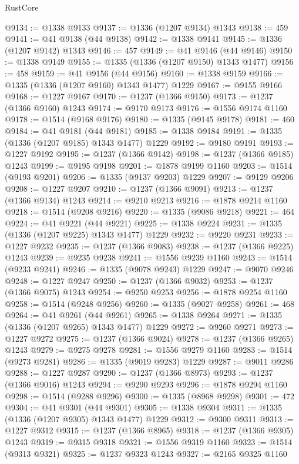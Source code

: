 \begin{lexlean}{RustCore}
\begin{coremodule}
@9134 := @1338 @9133
@9137 := @1336 (@1207 @9134) @1343
@9138 := 459
@9141 := @41 @9138 (@44 @9138)
@9142 := @1338 @9141
@9145 := @1336 (@1207 @9142) @1343
@9146 := 457
@9149 := @41 @9146 (@44 @9146)
@9150 := @1338 @9149
@9155 := @1335 (@1336 (@1207 @9150) @1343 @1477)
@9156 := 458
@9159 := @41 @9156 (@44 @9156)
@9160 := @1338 @9159
@9166 := @1335 (@1336 (@1207 @9160) @1343 @1477) @1229
@9167 := @9155 @9166
@9168 := @1227 @9167
@9170 := @1237 (@1366 @9150)
@9173 := @1237 (@1366 @9160) @1243
@9174 := @9170 @9173
@9176 := @1556 @9174 @1160
@9178 := @1514 (@9168 @9176)
@9180 := @1335 (@9145 @9178)
@9181 := 460
@9184 := @41 @9181 (@44 @9181)
@9185 := @1338 @9184
@9191 := @1335 (@1336 (@1207 @9185) @1343 @1477) @1229
@9192 := @9180 @9191
@9193 := @1227 @9192
@9195 := @1237 (@1366 @9142)
@9198 := @1237 (@1366 @9185) @1243
@9199 := @9195 @9198
@9201 := @1878 @9199 @1160
@9203 := @1514 (@9193 @9201)
@9206 := @1335 (@9137 @9203) @1229
@9207 := @9129 @9206
@9208 := @1227 @9207
@9210 := @1237 (@1366 @9091)
@9213 := @1237 (@1366 @9134) @1243
@9214 := @9210 @9213
@9216 := @1878 @9214 @1160
@9218 := @1514 (@9208 @9216)
@9220 := @1335 (@9086 @9218)
@9221 := 464
@9224 := @41 @9221 (@44 @9221)
@9225 := @1338 @9224
@9231 := @1335 (@1336 (@1207 @9225) @1343 @1477) @1229
@9232 := @9220 @9231
@9233 := @1227 @9232
@9235 := @1237 (@1366 @9083)
@9238 := @1237 (@1366 @9225) @1243
@9239 := @9235 @9238
@9241 := @1556 @9239 @1160
@9243 := @1514 (@9233 @9241)
@9246 := @1335 (@9078 @9243) @1229
@9247 := @9070 @9246
@9248 := @1227 @9247
@9250 := @1237 (@1366 @9032)
@9253 := @1237 (@1366 @9075) @1243
@9254 := @9250 @9253
@9256 := @1878 @9254 @1160
@9258 := @1514 (@9248 @9256)
@9260 := @1335 (@9027 @9258)
@9261 := 468
@9264 := @41 @9261 (@44 @9261)
@9265 := @1338 @9264
@9271 := @1335 (@1336 (@1207 @9265) @1343 @1477) @1229
@9272 := @9260 @9271
@9273 := @1227 @9272
@9275 := @1237 (@1366 @9024)
@9278 := @1237 (@1366 @9265) @1243
@9279 := @9275 @9278
@9281 := @1556 @9279 @1160
@9283 := @1514 (@9273 @9281)
@9286 := @1335 (@9019 @9283) @1229
@9287 := @9011 @9286
@9288 := @1227 @9287
@9290 := @1237 (@1366 @8973)
@9293 := @1237 (@1366 @9016) @1243
@9294 := @9290 @9293
@9296 := @1878 @9294 @1160
@9298 := @1514 (@9288 @9296)
@9300 := @1335 (@8968 @9298)
@9301 := 472
@9304 := @41 @9301 (@44 @9301)
@9305 := @1338 @9304
@9311 := @1335 (@1336 (@1207 @9305) @1343 @1477) @1229
@9312 := @9300 @9311
@9313 := @1227 @9312
@9315 := @1237 (@1366 @8965)
@9318 := @1237 (@1366 @9305) @1243
@9319 := @9315 @9318
@9321 := @1556 @9319 @1160
@9323 := @1514 (@9313 @9321)
@9325 := @1237 @9323 @1243
@9327 := @2165 @9325 @1160

\end{coremodule}
\end{lexlean}
